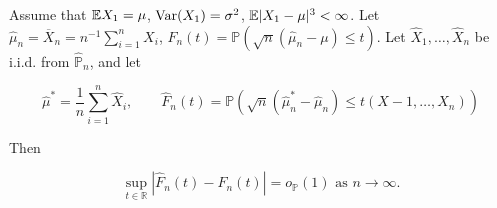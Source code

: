 \begin{theorem}

Assume that \(\E X_1 = \mu\), \(\Var(X_1) = \sigma^2\), \(\E|X_1 - \mu|^3 < \infty\). Let \(\hat{\mu}_n = \overline{X}_n =n^{-1} \sum_{i=1}^n X_i\), \(F_n(t) = \mathbb{P}(\sqrt{n}(\hat{\mu}_n - \mu) \leq t)\). Let \(\hat{X}_1, \ldots, \hat{X}_n\) be i.i.d. from \(\hat{\mathbb{P}}_n\), and let 

\[
\hat{\mu}^* = \frac{1}{n} \sum_{i=1}^n \hat{X}_i, \qquad \hat{F}_n(t) = \mathbb{P}\left( \sqrt{n}(\hat{\mu}_n^* - \hat{\mu}_n) \leq t(X-1, \ldots, X_n) \right)
\]

Then

\[
\sup_{t \in \mathbb{R}} \left| \hat{F}_n(t) - F_n(t) \right| = o_{\mathbb{P}}(1) \text{ as } n \to \infty.
\]


\end{theorem}

